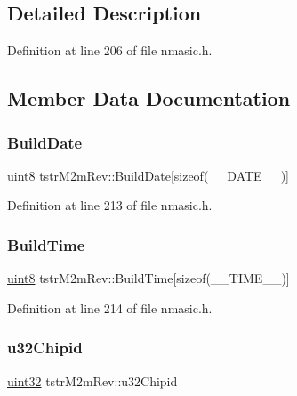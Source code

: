 \subsection{Detailed Description}


Definition at line 206 of file nmasic.\+h.



\subsection{Member Data Documentation}
\mbox{\label{structtstrM2mRev_a495ca1b146e9596e0f65ace99f663934}} 
\subsubsection{\texorpdfstring{Build\+Date}{BuildDate}}
{\footnotesize\ttfamily \hyperlink{group__DataT_ga4df709a77647e870bbf1d955b8edc9a6}{uint8} tstr\+M2m\+Rev\+::\+Build\+Date\mbox{[}sizeof(\+\_\+\+\_\+\+D\+A\+T\+E\+\_\+\+\_\+)\mbox{]}}



Definition at line 213 of file nmasic.\+h.

\mbox{\label{structtstrM2mRev_abb8e31ceb2483c78fb14e87dd7eb64ee}} 
\subsubsection{\texorpdfstring{Build\+Time}{BuildTime}}
{\footnotesize\ttfamily \hyperlink{group__DataT_ga4df709a77647e870bbf1d955b8edc9a6}{uint8} tstr\+M2m\+Rev\+::\+Build\+Time\mbox{[}sizeof(\+\_\+\+\_\+\+T\+I\+M\+E\+\_\+\+\_\+)\mbox{]}}



Definition at line 214 of file nmasic.\+h.

\mbox{\label{structtstrM2mRev_a3c347a43e00bcdfa90011826c6b5ea75}} 
\subsubsection{\texorpdfstring{u32\+Chipid}{u32Chipid}}
{\footnotesize\ttfamily \hyperlink{group__DataT_ga100e7c691a47d6978527c479a0158245}{uint32} tstr\+M2m\+Rev\+::u32\+Chipid}



